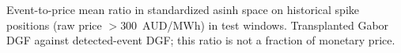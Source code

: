 \providecommand{\materialsdir}{.}
\begin{table}[t]
  \centering
  \caption{Event-to-price mean ratio in standardized asinh space on
    historical spike positions (raw price $>300$~AUD/MWh) in test windows.
    Transplanted Gabor DGF against detected-event DGF; this ratio is not a
    fraction of monetary price.}
  \label{tab:field-separation}
  \small
  
\end{table}
